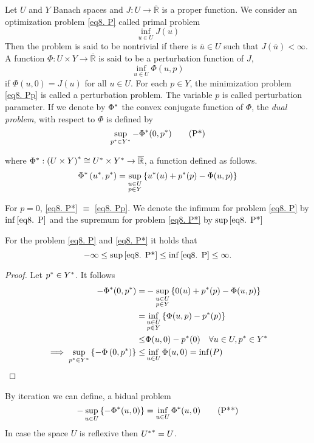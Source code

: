 \begin{definition}
Let $U$ and $Y$ Banach spaces and $J: U\rightarrow \overline{\mathbb{R}}$ is a proper function. We consider an optimization problem \eqref{eq8. P} called primal problem
 \[
 \inf_{u\in U} J(u) \tag{P} \label{eq8. P}
 \] 
 Then the problem is said to be nontrivial if there is $\overline{u} \in U$ such that $J(\overline{u}) < \infty$. A function $\Phi : U \times Y \rightarrow \overline{\mathbb{R}}$ is said to be a perturbation function of $J$, 
 \[
 \inf_{u\in U} \Phi (u,p) \tag{Pp}\label{eq8. Pp}
 \]
 if $\Phi(u, 0)=J(u)$ for all $u \in U$. For each $p \in Y$, the minimization problem \eqref{eq8. Pp} is called a perturbation problem. The variable $p$ is called perturbation parameter. If we denote by ${\Phi}^{\ast}$ the convex conjugate function of $\Phi$, the \textit{dual problem}, with respect to $\Phi$ is defined by
 \[
 \sup_{{p}^{\ast}\in {Y}^{\ast}}-{\Phi}^{\ast}(0,{p}^{\ast}) \label{eq8. P*}\tag{P*}
 \]
 
 where ${\Phi}^{\ast}: {(U\times Y)}^{\ast} \cong {U}^{\ast}\times{Y}^{\ast}\rightarrow \overline{\mathbb{R}}$, a function defined as follows.
 \[
 {\Phi}^{\ast}\left({u}^{\ast}, {p}^{\ast} \right) = \sup_{\substack{u \in U\\ p\in Y}} \left\lbrace {u}^{\ast}(u)+{p}^{\ast}(p)-\Phi(u,p)\right\rbrace
 \] 

\end{definition}
 \begin{remark}
For $p=0$, \eqref{eq8. P*} $\equiv$ \eqref{eq8. Pp}. We denote the infimum for problem \eqref{eq8. P} by $\inf\eqref{eq8. P}$ and the supremum for problem \eqref{eq8. P*} by $\sup \eqref{eq8. P*}$
 \end{remark}

 
 \begin{lemma}
 	For the problem \eqref{eq8. P} and \eqref{eq8. P*} it holds that
 	\[
 	 -\infty \leq \sup\eqref{eq8. P*} \leq \inf\eqref{eq8. P} \leq \infty.
 	\]
 	\begin{proof}
 		Let ${p}^{\ast}\in{Y}^{\ast}$. It follows
 		\begin{align}
 			-{\Phi}^{\ast}(0,{p}^{\ast})=&-\sup_{\substack{u\in U\\ p\in Y}}\left\lbrace 0(u) + {p}^{\ast}(p)-\Phi(u,p)
 			\right\rbrace\\
 			=&\inf_{\substack{u\in U\\p\in Y}} \left\lbrace\Phi(u,p)-{p}^{\ast}(p)\right\rbrace\\
 			\leq & \Phi(u,0)-{p}^{\ast}(0)\quad \forall u \in U, {p}^{\ast} \in {Y}^{\ast}\\
 			\implies \sup_{ {p}^{\ast}\in {Y}^{\ast}}\left\lbrace-\Phi\left(0, {p}^{\ast}\right) \right\rbrace \leq&\inf_{u\in U} \Phi (u, 0) = \inf(P)
 		\end{align}
 	 \end{proof}
 	\end{lemma}
 	By iteration we can define, a bidual problem 
 	\[
 	-\sup_{u \in U} \left\lbrace-{\Phi}^{\ast}(u,0)\right\rbrace=\inf_{u\in U} {\Phi}^{\ast}(u,0) \tag{P**} \label{eq8. BiDual Problem}
 	\]
 	In case the space $U$ is reflexive then ${{U}^{\ast}}^{\ast}=U$.
 	
